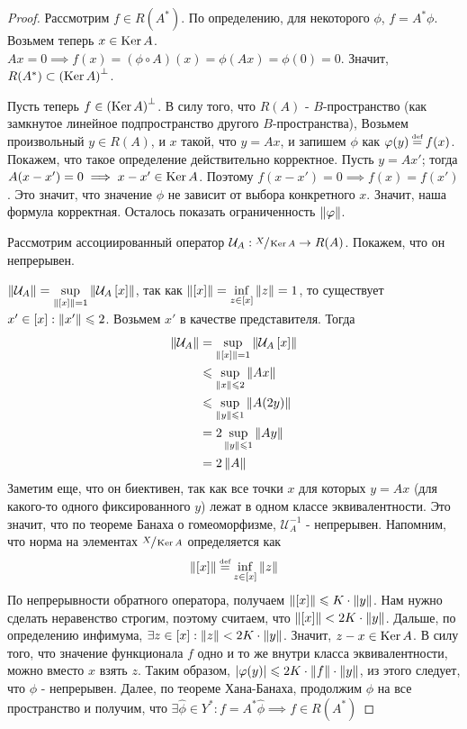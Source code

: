 \begin{proof}
	Рассмотрим $f \in R(A^*)$. По определению, для некоторого $\phi$, $f = A^*\phi$.
	Возьмем теперь $x \in \operatorname{Ker} A$. $Ax = 0 \implies f(x) = (\phi \circ A)(x) = \phi(Ax) = \phi(0) = 0$.
	Значит, $R(A^*) \subset \left( \operatorname{Ker} A\right)^\bot$.
	
	Пусть теперь $f \in \left( \operatorname{Ker} A\right)^\bot$. В силу того, что $R(A)$ - $B$-пространство 
	(как замкнутое линейное подпространство другого $B$-пространства), 
	Возьмем произвольный $y \in R(A)$, и $x$ такой, что $y = Ax$,
	и запишем $\phi$ как $\phi(y) \defeq f(x)$. Покажем, что такое определение 
	действительно корректное.
	Пусть $y = Ax'$; тогда $A(x - x') = 0 \implies x - x' \in \operatorname{Ker} A$.
	Поэтому $f(x - x') = 0 \implies f(x) = f(x')$. Это значит, что значение $\phi$ не
	зависит от выбора конкретного $x$. Значит, наша формула корректная.
	Осталось показать ограниченность $\left\|\varphi\right\|$.

	Рассмотрим ассоциированный оператор 
	$\mathcal{U}_A : \sfrac{X}{\operatorname{Ker} A} \rightarrow R(A)$.
	Покажем, что он непрерывен.    

	$\left\|\mathcal{U}_A\right\| = \sup\limits_{\left\|\left[x \right]\right\| = 1} \left\|\mathcal{U}_A\left[x \right]\right\|$,
	так как $\left\|\left[x \right]\right\| = \inf\limits_{z \in \left[x \right]} \left\|z\right\| = 1$, 
	то существует $x' \in \left[x \right] : \left\|x'\right\| \leqslant 2$.
	Возьмем $x'$ в качестве представителя. Тогда 
	\begin{equation}
		\begin{split}
			\left\|\mathcal{U}_A\right\| & = 
			\sup\limits_{\left\|\left[x \right]\right\| = 1} \left\|\mathcal{U}_A\left[x \right]\right\| \\
			& \leqslant \sup\limits_{\left\|x\right\| \leqslant 2} \left\|Ax\right\| \\
			& \leqslant \sup\limits_{\left\|y\right\| \leqslant 1} \left\|A(2y)\right\| \\
			& = 2 \sup\limits_{\left\|y\right\| \leqslant 1} \left\|Ay\right\| \\
			& = 2 \left\|A\right\|
		\end{split}
	\end{equation}
	Заметим еще, что он биективен, так как все точки $x$ для которых $y = Ax$ 
	(для какого-то одного фиксированного
	$y$) лежат в одном классе эквивалентности. Это значит, что по теореме Банаха о гомеоморфизме, 
	$\mathcal{U}_A^{-1}$ - непрерывен. Напомним, что норма на элементах $\sfrac{X}{\operatorname{Ker} A}$
	определяется как 
	\begin{gather}
		\norm{\eqcls{x}} \defeq \inf\limits_{z \in \eqcls{x}} \norm{z}
	\end{gather}
	По непрерывности обратного оператора, получаем $\left\|\left[x \right]\right\| \leqslant K \cdot \left\|y\right\|$.
	Нам нужно сделать неравенство строгим, поэтому считаем, что 
	$\left\|\left[x \right]\right\| < 2K \cdot \left\|y\right\|$. Дальше, по определению инфимума, 
	$\exists z \in \left[x \right] : \left\|z\right\| < 2K \cdot \left\|y\right\|$. Значит, $z - x \in \operatorname{Ker} A$.
	В силу того, что значение функционала $f$ одно и то же внутри класса эквивалентности,
	можно вместо $x$ взять $z$. Таким образом, 
	$\left|\varphi(y)\right| \leqslant 2K \cdot \left\|f\right\| \cdot \left\|y\right\|$, из этого следует, что 
	$\phi$ - непрерывен. 
	Далее, по теореме Хана-Банаха, продолжим $\phi$ на все пространство и получим, что 
	$\exists \widehat{\phi} \in Y^* : f = A^*\widehat{\phi} \implies f \in R(A^*)$
		
\end{proof}


